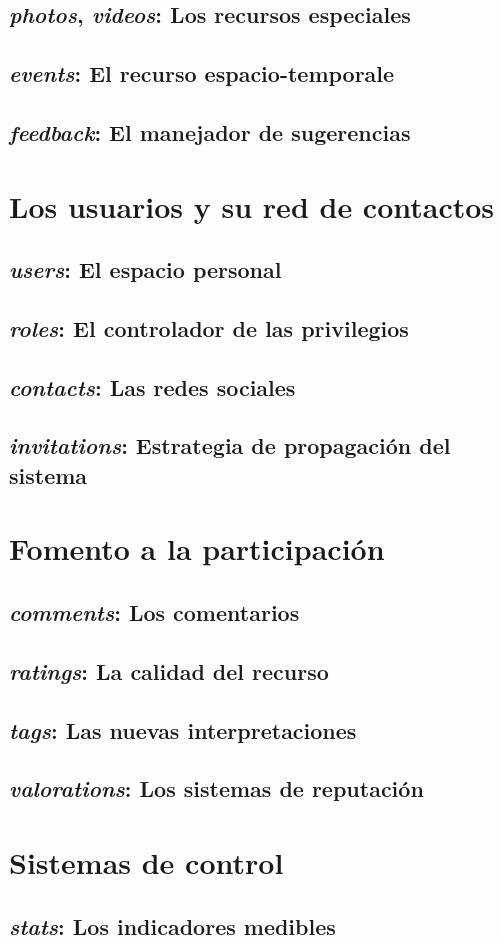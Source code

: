 \subsection{\emph{photos}, \emph{videos}: Los recursos especiales}
\subsection{\emph{events}: El recurso espacio-temporale}
\subsection{\emph{feedback}: El manejador de sugerencias}

\section{Los usuarios y su red de contactos}
\subsection{\emph{users}: El espacio personal}
\subsection{\emph{roles}: El controlador de las privilegios}
\subsection{\emph{contacts}: Las redes sociales}
\subsection{\emph{invitations}: Estrategia de propagación del sistema}

\section{Fomento a la participación}
\subsection{\emph{comments}: Los comentarios}
\subsection{\emph{ratings}: La calidad del recurso}
\subsection{\emph{tags}: Las nuevas interpretaciones}
\subsection{\emph{valorations}: Los sistemas de reputación}

\section{Sistemas de control}
\subsection{\emph{stats}: Los indicadores medibles}

